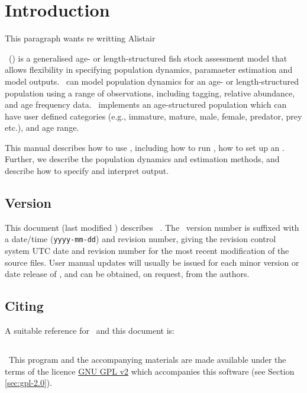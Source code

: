 \section{Introduction\label{sec:Introduction}}

\KL This paragraph wants re writting Alistair \KLend

\CNAME\ (\cname) is a generalised age- or length-structured fish stock assessment model that allows flexibility in specifying population dynamics, paramaeter estimation and model outputs. \CNAME\ can model population dynamics for an age- or length-structured population using a range of observations, including tagging, relative abundance, and age frequency data. \CNAME\ implements an age-structured population which can have user defined categories (e.g., immature, mature, male, female, predator, prey etc.), and age range. 

This manual describes how to use \CNAME, including how to run \CNAME, how to set up an \config. Further, we describe the population dynamics and estimation methods, and describe how to specify and interpret output. 

\subsection{Version\label{sec:version}}
This document (last modified \DocVer) describes \CNAME\ \VER. The \CNAME\ version number is suffixed with a date/time (\texttt{yyyy-mm-dd}) and revision number, giving the revision control system UTC date and revision number for the most recent modification of the source files. User manual updates will usually be issued for each minor version or date release of \CNAME, and can be obtained, on request, from the authors.

\subsection{Citing \CNAME}
A suitable reference for \CNAME\ and this document is:

\ManualRef{}

\subsection{}
\
This program and the accompanying materials are made available under the terms of the licence \href{http://www.gnu.org/licenses/old-licenses/gpl-2.0.en.html}{GNU GPL v2} which accompanies this software (see Section \ref{sec:gpl-2.0}).

